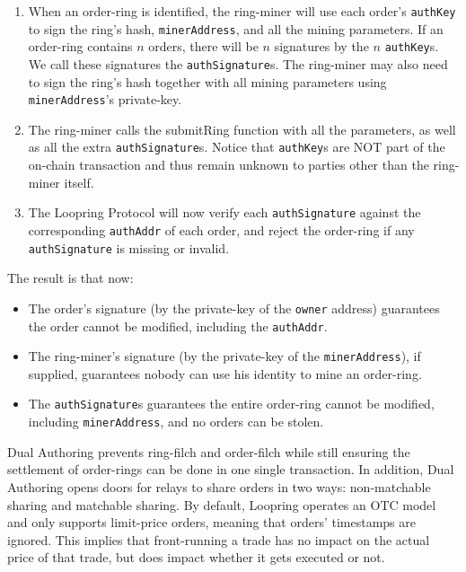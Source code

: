 \documentclass[UTF8,nofonts]{article}
\begin{document}
\begin{multicols}{2}
\begin{enumerate}
	\item When an order-ring is identified, the ring-miner will use each order's \verb|authKey| to sign the ring's hash, \verb|minerAddress|, and all the mining parameters. If an order-ring contains $n$ orders, there will be $n$ signatures by the $n$ \verb|authKey|s. We call these signatures the \verb|authSignature|s. The ring-miner may also need to sign the ring's hash together with all mining parameters using \verb|minerAddress|'s private-key.

	\item The ring-miner calls the submitRing function with all the parameters, as well as all the extra \verb|authSignature|s. Notice that \verb|authKey|s are NOT part of the on-chain transaction and thus remain unknown to parties other than the ring-miner itself.


	\item The Loopring Protocol will now verify each \verb|authSignature| against the corresponding \verb|authAddr| of each order, and reject the order-ring if any \verb|authSignature| is missing or invalid.
 
\end{enumerate}

The result is that now:

\begin{itemize}

	\item  The order's signature (by the private-key of the \verb|owner| address) guarantees the order cannot be modified, including the \verb|authAddr|.
	\item  The ring-miner's signature (by the private-key of the \verb|minerAddress|), if supplied, guarantees nobody can use his identity to mine an order-ring.
	\item  The \verb|authSignature|s guarantees the entire order-ring cannot be modified, including \verb|minerAddress|, and no orders can be stolen.

\end{itemize}

Dual Authoring prevents ring-filch and order-filch while still ensuring the settlement of order-rings can be done in one single transaction. In addition, Dual Authoring opens doors for relays to share orders in two ways: non-matchable sharing and matchable sharing. By default, Loopring operates an OTC model and only supports limit-price orders, meaning that orders' timestamps are ignored. This implies that front-running a trade has no impact on the actual price of that trade, but does impact whether it gets executed or not.


\end{multicols}
\end{document}
